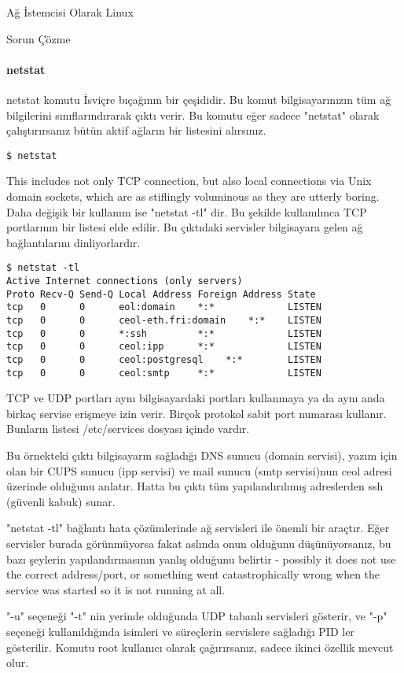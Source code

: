 \begin{section}{Ağ İstemcisi Olarak Linux}
\begin{subsection}{Sorun Çözme}
\paragraph{netstat}{netstat komutu İsviçre bıçağının bir çeşididir. Bu komut bilgisayarınızın tüm ağ bilgilerini sınıflarındırarak çıktı verir. Bu komutu eğer sadece "netstat" olarak çalıştırırsanız bütün aktif ağların bir listesini alırsınız.}
\begin{verbatim}
$ netstat
\end{verbatim}
This includes not only TCP connection, but also local connections via Unix domain sockets, which are as stiflingly voluminous as they are utterly boring. Daha değişik bir kullanım ise "netstat -tl" dir. Bu şekilde kullanılınca TCP portlarının bir listesi elde edilir. Bu çıktıdaki servisler bilgisayara gelen ağ bağlantılarını dinliyorlardır.
\begin{verbatim}
$ netstat -tl
Active Internet connections (only servers)
Proto Recv-Q Send-Q Local Address Foreign Address State
tcp   0      0      eol:domain    *:*             LISTEN
tcp   0      0      ceol-eth.fri:domain    *:*    LISTEN
tcp   0      0      *:ssh         *:*             LISTEN
tcp   0      0      ceol:ipp      *:*             LISTEN
tcp   0      0      ceol:postgresql    *:*        LISTEN
tcp   0      0      ceol:smtp     *:*             LISTEN

\end{verbatim}

TCP ve UDP portları aynı bilgisayardaki portları kullanmaya ya da aynı anda birkaç servise erişmeye izin verir. Birçok protokol sabit port numarası kullanır. Bunların listesi /etc/services dosyası içinde vardır. 

Bu örnekteki çıktı bilgisayarın sağladığı DNS sunucu (domain servisi), yazım için olan bir CUPS sunucu (ipp servisi) ve mail sunucu (smtp servisi)nun ceol adresi üzerinde olduğunu anlatır. Hatta bu çıktı tüm yapılandırılımış adreslerden ssh (güvenli kabuk) sunar.

"netstat -tl" bağlantı hata çözümlerinde ağ servisleri ile  önemli bir araçtır. Eğer servisler burada görünmüyorsa fakat aslında onun olduğunu düşünüyorsanız, bu bazı şeylerin yapılandırmasının yanlış olduğunu belirtir - possibly it does not use the correct address/port, or something went catastrophically wrong when the service was started so it is not running at all.

"-u" seçeneği "-t" nin yerinde olduğunda UDP tabanlı servisleri gösterir, ve "-p" seçeneği kullanıldığında isimleri ve süreçlerin servislere sağladığı PID ler gösterilir. Komutu root kullanıcı olarak çağırırsanız, sadece ikinci özellik mevcut olur. 


\end{subsection}
\end{section}
